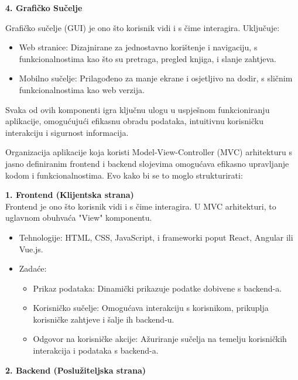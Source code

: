  \textbf{4. Grafičko Sučelje}

Grafičko sučelje (GUI) je ono što korisnik vidi i s čime interagira. Uključuje:
\begin{itemize}
		  \item {Web stranice: Dizajnirane za jednostavno korištenje i navigaciju, s funkcionalnostima kao što su pretraga, pregled knjiga, i slanje zahtjeva.}
		  \item {Mobilno sučelje: Prilagođeno za manje ekrane i osjetljivo na dodir, s sličnim funkcionalnostima kao web verzija.}	\\
	   \end{itemize} 

Svaka od ovih komponenti igra ključnu ulogu u uspješnom funkcioniranju aplikacije, omogućujući efikasnu obradu podataka, intuitivnu korisničku interakciju i sigurnost informacija.

\eject

Organizacija aplikacije koja koristi Model-View-Controller (MVC) arhitekturu s jasno definiranim frontend i backend slojevima omogućava efikasno upravljanje kodom i funkcionalnostima. Evo kako bi se to moglo strukturirati:

 \textbf{1. Frontend (Klijentska strana)}\\

Frontend je ono što korisnik vidi i s čime interagira. U MVC arhitekturi, to uglavnom obuhvaća "View" komponentu.
\begin{itemize}
		  \item {Tehnologije: HTML, CSS, JavaScript, i frameworki poput React, Angular ili Vue.js.}
		  \item {Zadaće:
    \begin{itemize}
		  \item {Prikaz podataka: Dinamički prikazuje podatke dobivene s backend-a.}
		  \item {Korisničko sučelje: Omogućava interakciju s korisnikom, prikuplja korisničke zahtjeve i šalje ih backend-u.}	
            \item {Odgovor na korisničke akcije: Ažuriranje sučelja na temelju korisničkih interakcija i podataka s backend-a.}
	   \end{itemize}}	
            
	   \end{itemize}


 \textbf{2. Backend (Poslužiteljska strana)}\\

